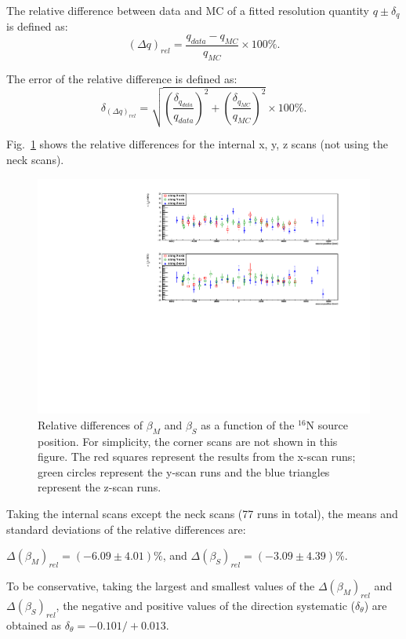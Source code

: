 The relative difference between data and MC of a fitted resolution quantity $q\pm \delta_q$ is defined as:
\begin{equation}
(\Delta q)_{rel} = \frac{q_{data}-q_{MC}}{q_{MC}}\times 100\%.
\end{equation}

The error of the relative difference is defined as: 
\begin{equation}
\delta_{(\Delta q)_{rel}} = \sqrt{(\frac{\delta_{q_{data}}}{q_{data}})^2+(\frac{\delta_{q_{MC}}}{q_{MC}})^2}\times 100\%.
\end{equation}\label{eq:erors_relativeBiases}

Fig.~\ref{relative_biasesVsPositions} shows the relative differences for the internal x, y, z scans (not using the neck scans).
\begin{figure}[!htb]
	\centering
	\includegraphics[width=16cm]{angularResol_scanXYZ.pdf}
	\caption{Relative differences of $\beta_M$ and $\beta_S$ as a function of the $^{16}$N source position. For simplicity, the corner scans are not shown in this figure. The red squares represent the results from the x-scan runs; green circles represent the y-scan runs and the blue triangles represent the z-scan runs.}
	\label{relative_biasesVsPositions}
\end{figure}

Taking the internal scans except the neck scans (77 runs in total), the means and standard deviations of the relative differences are:

$\Delta(\beta_M)_{rel}=(-6.09\pm4.01)\%$, and $\Delta(\beta_S)_{rel}=(-3.09\pm4.39)\%$.

To be conservative, taking the largest and smallest values of the $\Delta(\beta_M)_{rel}$ and $\Delta(\beta_S)_{rel}$, the negative and positive values of the direction systematic ($\delta_\theta$) are obtained as $\delta_\theta=-0.101/+0.013$.

